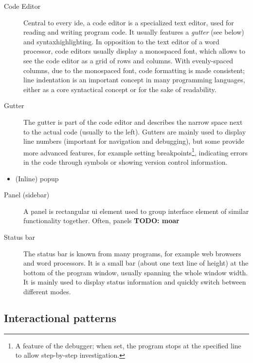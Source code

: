 \begin{description}
\item[Code Editor]
Central to every \gls{ide}, a code editor is a specialized text editor,
used for reading and writing program code. It usually features a
\emph{gutter} (see below) and \gls{syntaxhighlighting}. In opposition to
the text editor of a word processor, code editors usually display a
monospaced font, which allows to see the code editor as a grid of rows
and columns. With evenly-spaced columns, due to the monospaced font,
code formatting is made consistent; line indentation is an important
concept in many programming languages, either as a core syntactical
concept or for the sake of readability.
\item[Gutter]
The gutter is part of the code editor and describes the narrow space
next to the actual code (usually to the left). Gutters are mainly used
to display line numbers (important for navigation and debugging), but
some provide more advanced features, for example setting
breakpoints\footnote{A feature of the debugger; when set, the program
  stops at the specified line to allow step-by-step investigation.},
indicating errors in the code through symbols or showing version control
information.
\end{description}

\begin{itemize}
\itemsep1pt\parskip0pt
\item
  (Inline) popup
\end{itemize}

\begin{description}
\item[Panel (sidebar)]
A panel is rectangular \ac{ui} element used to group interface element
of similar functionality together. Often, panels \textbf{TODO: moar}
\item[Status bar]
The status bar is known from many programs, for example web browsers and
word processors. It is a small bar (about one text line of height) at
the bottom of the program window, usually spanning the whole window
width. It is mainly used to display status information and quickly
switch between different modes.
\end{description}

\subsection{Interactional patterns}\label{interactional-patterns}

